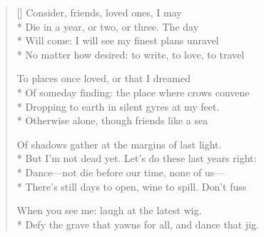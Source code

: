 \label{ch:banish_misfortune}
\settowidth{\versewidth}{There's still days to open, wine to spill.    Don't fuss}
\begin{verse}[\versewidth]
Consider, friends, loved ones, I may\\*
Die in a year, or two, or three.   The day\\*
Will come: I will see my finest plans unravel\\*
No matter how desired: to write, to love, to travel

To places once loved, or that I dreamed\\*
Of someday finding: the place where crows convene\\*
Dropping to earth in silent gyres at my feet.\\*
Otherwise alone, though friends like a sea

Of shadows gather at the margins of last light.\\*
But I'm not dead yet. Let's do these last years right:\\*
Dance---not die before our time, none of us---\\*
There's still days to open, wine to spill.    Don't fuss

When you see me: laugh at the latest wig.\\*
Defy the grave that yawns for all, and dance that jig.
\end{verse}
